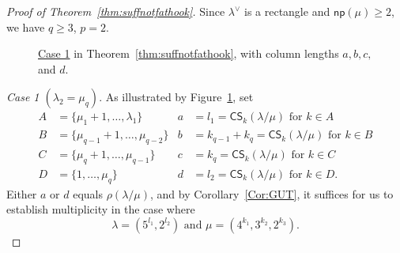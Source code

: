 \documentclass[ALCO,ThmDefs,Unicode,epreuves]{cedram}
\newcommand{\np}{\mathsf{np}}
\newcommand{\CS	}{\mathsf{CS}}
\let\hypertargeta\hypertarget %
\let\hyperlinka\hyperlink %
\newenvironment{Case}[1]{\par\vskip2pt\noindent%
\emph{#1}.}{\vskip2pt}
\begin{document}
\begin{proof}[Proof of Theorem~\ref{thm:suffnotfathook}] 
Since $\lambda^\vee$ is a rectangle and $\np (\mu) \geq 2$, we have $q\geq 3$, $p=2$.


\begin{figure}[b]\centering
 
 
 \caption[Case 1 in Theorem~\ref{thm:suffnotfathook}, with column lengths $a,b,c,$ and $d$.]{\hyperlinka{Theo3.9case_1}{Case 1} in Theorem~\ref{thm:suffnotfathook}, with column lengths $a,b,c,$ and $d$.}
 \label{case1necessary} 
\end{figure}



\begin{Case}
{\hypertargeta{Theo3.9case_1}{Case 1} $(\lambda_2 = \mu_q)$} 
As illustrated by Figure~\ref{case1necessary}, set
\begin{align*}
A & = \{ \mu_1 + 1,\ldots,\lambda_1 \} & a & = l_1 = \CS _k(\lambda / \mu)\text{ for }k \in A \\
B & = \{ \mu_{q-1} + 1,\ldots,\mu_{q-2} \} & b & = k_{q-1} + k_q = \CS _k(\lambda / \mu)\text{ for }k \in B \\
C & = \{ \mu_{q} + 1,\ldots,\mu_{q-1} \} & c & = k_q = \CS _k(\lambda / \mu)\text{ for }k \in C \\
D & = \{ 1,\ldots,\mu_{q} \} & d & = l_2 = \CS _k(\lambda / \mu)\text{ for }k \in D.
\end{align*}
Either $a$ or $d$ equals $\rho(\lambda/\mu)$, and by Corollary~\ref{Cor:GUT}, it suffices for us to establish multiplicity in the case where
\[
\lambda = (5^{l_1},2^{l_2})\text{ and }\mu = (4^{k_1},3^{k_2},2^{k_3}).
\]


\end{Case}
\end{proof}
\end{document}
